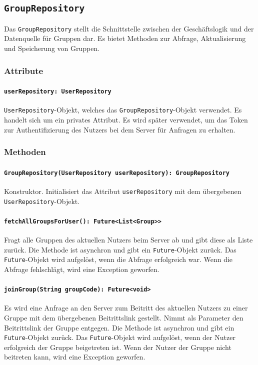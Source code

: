 \documentclass{entwurfsheft}
\begin{document}
\newpage
\subsection{\texttt{GroupRepository}}\label{sec:GroupRepository}
Das \texttt{GroupRepository} stellt die Schnittstelle zwischen der Geschäftslogik und der Datenquelle für Gruppen dar. Es bietet Methoden zur Abfrage, Aktualisierung und Speicherung von Gruppen.
\subsubsection*{Attribute}
\paragraph{\texttt{userRepository: UserRepository}}
\texttt{UserRepository}-Objekt, welches das \texttt{GroupRepository}-Objekt verwendet. Es handelt sich um ein privates Attribut. Es wird später verwendet, um das Token zur Authentifizierung des Nutzers bei dem Server für Anfragen zu erhalten.
\subsubsection*{Methoden}
\paragraph{\texttt{GroupRepository(UserRepository userRepository): GroupRepository}}
Konstruktor. Initialisiert das Attribut \texttt{userRepository} mit dem übergebenen \texttt{UserRepository}-Objekt.
\paragraph{\texttt{fetchAllGroupsForUser(): Future<List<Group>>}}
Fragt alle Gruppen des aktuellen Nutzers beim Server ab und gibt diese als Liste zurück. Die Methode ist asynchron und gibt ein \texttt{Future}-Objekt zurück. Das \texttt{Future}-Objekt wird aufgelöst, wenn die Abfrage erfolgreich war. Wenn die Abfrage fehlschlägt, wird eine Exception geworfen.
\paragraph{\texttt{joinGroup(String groupCode): Future<void>}}
Es wird eine Anfrage an den Server zum Beitritt des aktuellen Nutzers zu einer Gruppe mit dem übergebenen Beitrittslink gestellt. Nimmt als Parameter den Beitrittslink der Gruppe entgegen. Die Methode ist asynchron und gibt ein \texttt{Future}-Objekt zurück. Das \texttt{Future}-Objekt wird aufgelöst, wenn der Nutzer erfolgreich der Gruppe beigetreten ist. Wenn der Nutzer der Gruppe nicht beitreten kann, wird eine Exception geworfen.
\end{document}
